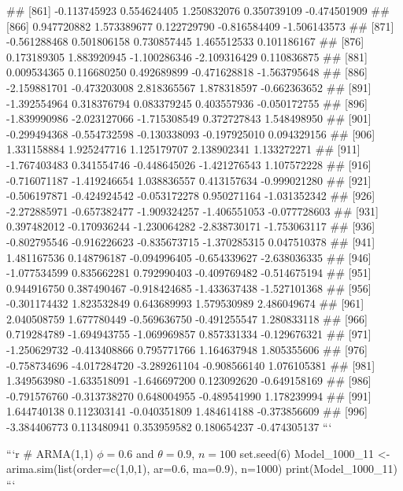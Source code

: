 \documentclass[
]{article}
\begin{document}
\begin{enumerate}[label=(\alph*)]
##  [861] -0.113745923  0.554624405  1.250832076  0.350739109 -0.474501909
##  [866]  0.947720882  1.573389677  0.122729790 -0.816584409 -1.506143573
##  [871] -0.561288468  0.501806158  0.730857445  1.465512533  0.101186167
##  [876]  0.173189305  1.883920945 -1.100286346 -2.109316429  0.110836875
##  [881]  0.009534365  0.116680250  0.492689899 -0.471628818 -1.563795648
##  [886] -2.159881701 -0.473203008  2.818365567  1.878318597 -0.662363652
##  [891] -1.392554964  0.318376794  0.083379245  0.403557936 -0.050172755
##  [896] -1.839990986 -2.023127066 -1.715308549  0.372727843  1.548498950
##  [901] -0.299494368 -0.554732598 -0.130338093 -0.197925010  0.094329156
##  [906]  1.331158884  1.925247716  1.125179707  2.138902341  1.133272271
##  [911] -1.767403483  0.341554746 -0.448645026 -1.421276543  1.107572228
##  [916] -0.716071187 -1.419246654  1.038836557  0.413157634 -0.999021280
##  [921] -0.506197871 -0.424924542 -0.053172278  0.950271164 -1.031352342
##  [926] -2.272885971 -0.657382477 -1.909324257 -1.406551053 -0.077728603
##  [931]  0.397482012 -0.170936244 -1.230064282 -2.838730171 -1.753063117
##  [936] -0.802795546 -0.916226623 -0.835673715 -1.370285315  0.047510378
##  [941]  1.481167536  0.148796187 -0.094996405 -0.654339627 -2.638036335
##  [946] -1.077534599  0.835662281  0.792990403 -0.409769482 -0.514675194
##  [951]  0.944916750  0.387490467 -0.918424685 -1.433637438 -1.527101368
##  [956] -0.301174432  1.823532849  0.643689993  1.579530989  2.486049674
##  [961]  2.040508759  1.677780449 -0.569636750 -0.491255547  1.280833118
##  [966]  0.719284789 -1.694943755 -1.069969857  0.857331334 -0.129676321
##  [971] -1.250629732 -0.413408866  0.795771766  1.164637948  1.805355606
##  [976] -0.758734696 -4.017284720 -3.289261104 -0.908566140  1.076105381
##  [981]  1.349563980 -1.633518091 -1.646697200  0.123092620 -0.649158169
##  [986] -0.791576760 -0.313738270  0.648004955 -0.489541990  1.178239994
##  [991]  1.644740138  0.112303141 -0.040351809  1.484614188 -0.373856609
##  [996] -3.384406773  0.113480941  0.353959582  0.180654237 -0.474305137
```

```r
# ARMA(1,1) $\phi=0.6$ and $\theta= 0.9$, $n=100$
set.seed(6)
Model_1000_11 <- arima.sim(list(order=c(1,0,1), ar=0.6, ma=0.9), n=1000)
print(Model_1000_11)
```


\end{enumerate}
\end{document}
